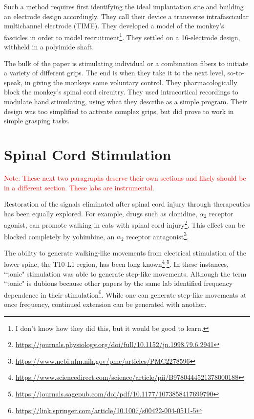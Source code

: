 Such a method requires first identifying the ideal implantation site and building an electrode design accordingly. They call their device a transverse intrafascicular multichannel electrode (TIME). They developed a model of the monkey's fascicles in order to model recruitment\footnote{I don't know how they did this, but it would be good to learn.}. They settled on a 16-electrode design, withheld in a polyimide shaft.\newline

The bulk of the paper is stimulating individual or a combination fibers to initiate a variety of different grips. The end is when they take it to the next level, so-to-speak, in giving the monkeys some voluntary control. They pharmacologically block the monkey's spinal cord circuitry. They used intracortical recordings to modulate hand stimulating, using what they describe as a simple program. Their design was too simplified to activate complex grips, but did prove to work in simple grasping tasks. 





\chapter{Spinal Cord Stimulation}

\label{sec:SpinalCordStimulation}

\textcolor{red}{Note: These next two paragraphs deserve their own sections and likely should be in a different section. These labs are instrumental.}

Restoration of the signals eliminated after spinal cord injury through therapeutics has been equally explored. For example, drugs such as clonidine, $\alpha_2$ receptor agonist, can promote walking in cats with spinal cord injury\footnote{\url{https://journals.physiology.org/doi/full/10.1152/jn.1998.79.6.2941}}. This effect can be blocked completely by yohimbine, an $\alpha_2$ receptor antagonist\footnote{\url{https://www.ncbi.nlm.nih.gov/pmc/articles/PMC2278596}}.\newline

The ability to generate walking-like movements from electrical stimulation of the lower spine, the T10-L1 region, has been long known\footnote{\url{https://www.sciencedirect.com/science/article/pii/B9780444521378000188}}$^,$\footnote{\url{https://journals.sagepub.com/doi/pdf/10.1177/1073858417699790}}. In these instances, ``tonic" stimulation was able to generate step-like movements. Although the term ``tonic" is dubious because other papers by the same lab identified frequency dependence in their stimulation\footnote{\url{https://link.springer.com/article/10.1007/s00422-004-0511-5}}. While one can generate step-like movements at once frequency, continued extension can be generated with another. \newline


